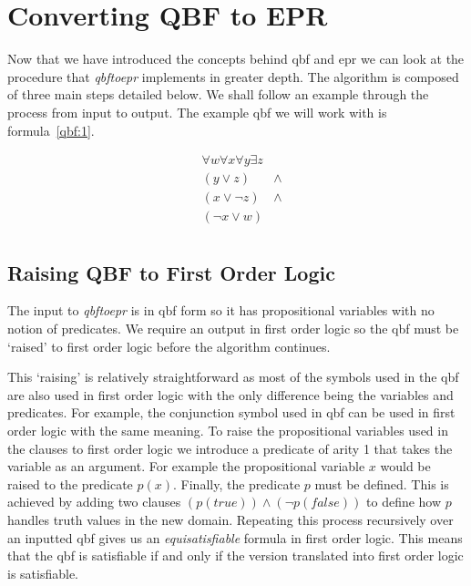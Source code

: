 \chapter{Converting QBF to EPR} \label{chapter:qbftoepr}
Now that we have introduced the concepts behind \gls{qbf} and \gls{epr} we can look at the procedure that \textit{qbftoepr} implements in greater depth. The algorithm is composed of three main steps detailed below. We shall follow an example through the process from input to output.
The example \gls{qbf} we will work with is formula~\ref{qbf:1}.

\begin{equation} \label{qbf:1}
\begin{aligned}
&\forall w \forall x \forall y \exists z \\
&(y \lor z) &\land\\
&(x \lor \neg z) &\land\\
&(\neg x \lor w)\\
\end{aligned}
\end{equation}

\section{Raising QBF to First Order Logic}
The input to \textit{qbftoepr} is in \gls{qbf} form so it has propositional variables with no notion of predicates. We require an output in first order logic so the \gls{qbf} must be `raised' to first order logic before the algorithm continues.

This `raising' is relatively straightforward as most of the symbols used in the \gls{qbf} are also used in first order logic with the only difference being the variables and predicates. For example, the conjunction symbol used in \gls{qbf} can be used in first order logic with the same meaning. To raise the propositional variables used in the clauses to first order logic we introduce a predicate of arity 1 that takes the variable as an argument. For example the propositional variable $x$ would be raised to the predicate $p(x)$. Finally, the predicate $p$ must be defined. This is achieved by adding two clauses $(p(true)) \land (\neg p(false))$ to define how $p$ handles truth values in the new domain. Repeating this process recursively over an inputted \gls{qbf} gives us an \textit{equisatisfiable} formula in first order logic. This means that the \gls{qbf} is satisfiable if and only if the version translated into first order logic is satisfiable.


